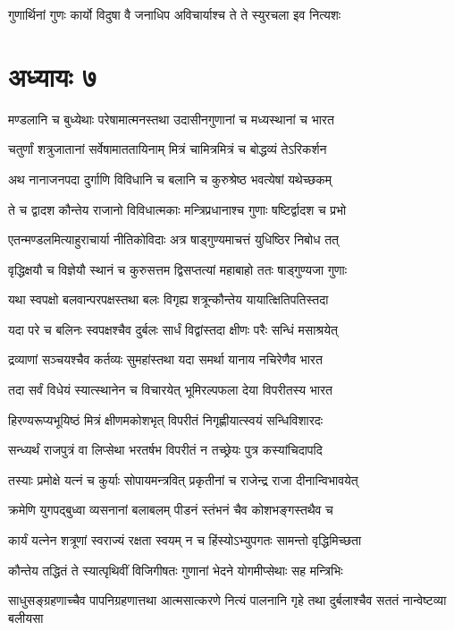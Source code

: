 \twolineshloka
{गुणार्थिनां गुणः कार्यो विदुषा वै जनाधिप}
{अविचार्याश्च ते ते स्युरचला इव नित्यशः}


\chapter{अध्यायः ७}
\twolineshloka
{मण्डलानि च बुध्येथाः परेषामात्मनस्तथा}
{उदासीनगुणानां च मध्यस्थानां च भारत}


\twolineshloka
{चतुर्णां शत्रुजातानां सर्वेषामाततायिनाम्}
{मित्रं चामित्रमित्रं च बोद्धव्यं तेऽरिकर्शन}


\twolineshloka
{अथ नानाजनपदा दुर्गाणि विविधानि च}
{बलानि च कुरुश्रेष्ठ भवत्येषां यथेच्छकम्}


\twolineshloka
{ते च द्वादश कौन्तेय राजानो विविधात्मकाः}
{मन्त्रिप्रधानाश्च गुणाः षष्टिर्द्वादश च प्रभो}


\twolineshloka
{एतन्मण्डलमित्याहुराचार्या नीतिकोविदाः}
{अत्र षाड्गुण्यमाचत्तं युधिष्ठिर निबोध तत्}


\twolineshloka
{वृद्धिक्षयौ च विज्ञेयौ स्थानं च कुरुसत्तम}
{द्विसप्तत्यां महाबाहो ततः षाड्गुण्यजा गुणाः}


\twolineshloka
{यथा स्वपक्षो बलवान्परपक्षस्तथा बलः}
{विगृह्य शत्रून्कौन्तेय यायात्क्षितिपतिस्तदा}


\twolineshloka
{यदा परे च बलिनः स्वपक्षश्चैव दुर्बलः}
{सार्धं विद्वांस्तदा क्षीणः परैः सन्धिं मसाश्रयेत्}


\twolineshloka
{द्रव्याणां सञ्चयश्चैव कर्तव्यः सुमहांस्तथा}
{यदा समर्था यानाय नचिरेणैव भारत}


\twolineshloka
{तदा सर्वं विधेयं स्यात्स्थानेन च विचारयेत्}
{भूमिरल्पफला देया विपरीतस्य भारत}


\twolineshloka
{हिरण्यरूप्यभूयिष्ठं मित्रं क्षीणमकोशभृत्}
{विपरीतं निगृह्णीयात्स्वयं सन्धिविशारदः}


\twolineshloka
{सन्ध्यर्थं राजपुत्रं वा लिप्सेथा भरतर्षभ}
{विपरीतं न तच्छ्रेयः पुत्र कस्यांचिदापदि}


\twolineshloka
{तस्याः प्रमोक्षे यत्नं च कुर्याः सोपायमन्त्रवित्}
{प्रकृतीनां च राजेन्द्र राजा दीनान्विभावयेत्}


\twolineshloka
{क्रमेणि युगपद्बुध्वा व्यसनानां बलाबलम्}
{पीडनं स्तंभनं चैव कोशभङ्गस्तथैव च}


\twolineshloka
{कार्यं यत्नेन शत्रूणां स्वराज्यं रक्षता स्वयम्}
{न च हिंस्योऽभ्युपगतः सामन्तो वृद्धिमिच्छता}


\twolineshloka
{कौन्तेय तद्धितं ते स्यात्पृथिवीं विजिगीषतः}
{गुणानां भेदने योगमीप्सेथाः सह मन्त्रिभिः}


\threelineshloka
{साधुसङ्ग्रहणाच्चैव पापनिग्रहणात्तथा}
{आत्मसात्करणे नित्यं पालनानि गृहे तथा}
{दुर्बलाश्चैव सततं नान्वेष्टव्या बलीयसा}



